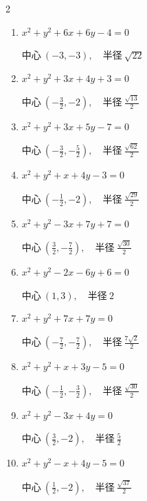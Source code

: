 \begin{multicols}{2}
\begin{enumerate}
        $\displaystyle 中心\: \left(-2,-\frac{1}{2}\right), \quad 半径 \ \frac{\sqrt{21}}{2}$

  \item $x^{2}+y^{2}+6x+6y-4=0$

        $\displaystyle 中心\: \left(-3,-3\right), \quad 半径 \ \sqrt{22}$

  \item $x^{2}+y^{2}+3x+4y+3=0$

        $\displaystyle 中心\: \left(-\frac{3}{2},-2\right), \quad 半径 \ \frac{\sqrt{13}}{2}$

  \item $x^{2}+y^{2}+3x+5y-7=0$

        $\displaystyle 中心\: \left(-\frac{3}{2},-\frac{5}{2}\right), \quad 半径 \ \frac{\sqrt{62}}{2}$

  \item $x^{2}+y^{2}+x+4y-3=0$

        $\displaystyle 中心\: \left(-\frac{1}{2},-2\right), \quad 半径 \ \frac{\sqrt{29}}{2}$

  \item $x^{2}+y^{2}-3x+7y+7=0$

        $\displaystyle 中心\: \left(\frac{3}{2},-\frac{7}{2}\right), \quad 半径 \ \frac{\sqrt{30}}{2}$

  \item $x^{2}+y^{2}-2x-6y+6=0$

        $\displaystyle 中心\: \left(1,3\right), \quad 半径 \ 2$

  \item $x^{2}+y^{2}+7x+7y=0$

        $\displaystyle 中心\: \left(-\frac{7}{2},-\frac{7}{2}\right), \quad 半径 \ \frac{7\sqrt{2}}{2}$

  \item $x^{2}+y^{2}+x+3y-5=0$

        $\displaystyle 中心\: \left(-\frac{1}{2},-\frac{3}{2}\right), \quad 半径 \ \frac{\sqrt{30}}{2}$

  \item $x^{2}+y^{2}-3x+4y=0$

        $\displaystyle 中心\: \left(\frac{3}{2},-2\right), \quad 半径 \ \frac{5}{2}$

  \item $x^{2}+y^{2}-x+4y-5=0$

        $\displaystyle 中心\: \left(\frac{1}{2},-2\right), \quad 半径 \ \frac{\sqrt{37}}{2}$

\columnbreak %


\end{enumerate}
\end{multicols}
